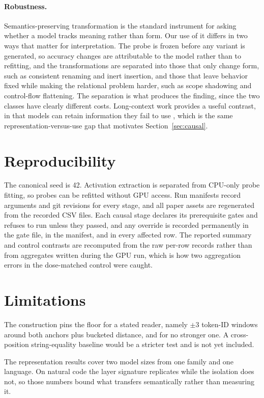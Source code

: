 \documentclass{article}
\begin{document}
\paragraph{Robustness.}
Semantics-preserving transformation is the standard instrument for asking whether a model tracks meaning rather than form. Our use of it differs in two ways that matter for interpretation. The probe is frozen before any variant is generated, so accuracy changes are attributable to the model rather than to refitting, and the transformations are separated into those that only change form, such as consistent renaming and inert insertion, and those that leave behavior fixed while making the relational problem harder, such as scope shadowing and control-flow flattening. The separation is what produces the finding, since the two classes have clearly different costs. Long-context work provides a useful contrast, in that models can retain information they fail to use \citep{lu2024longcontext}, which is the same representation-versus-use gap that motivates Section~\ref{sec:causal}.

\section{Reproducibility}

The canonical seed is 42. Activation extraction is separated from CPU-only probe fitting, so probes can be refitted without GPU access. Run manifests record arguments and git revisions for every stage, and all paper assets are regenerated from the recorded CSV files. Each causal stage declares its prerequisite gates and refuses to run unless they passed, and any override is recorded permanently in the gate file, in the manifest, and in every affected row. The reported summary and control contrasts are recomputed from the raw per-row records rather than from aggregates written during the GPU run, which is how two aggregation errors in the dose-matched control were caught.

\section{Limitations}

The construction pins the floor for a stated reader, namely $\pm3$ token-ID windows around both anchors plus bucketed distance, and for no stronger one. A cross-position string-equality baseline would be a stricter test and is not yet included.

The representation results cover two model sizes from one family and one language. On natural code the layer signature replicates while the isolation does not, so those numbers bound what transfers semantically rather than measuring it.
\end{document}
